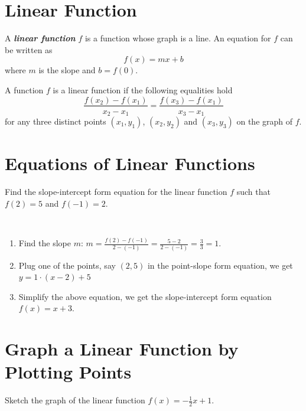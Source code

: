 \documentclass[en,11pt]{elegantbook}
\let\BeginKnitrBlock\begin \let\EndKnitrBlock\end
\begin{document}
\hypertarget{linear-function}{%
\section{Linear Function}\label{linear-function}}

A \textbf{\emph{linear function}} \(f\) is a function whose graph is a line. An equation for \(f\) can be written as
\[f(x) = mx + b\]
where \(m\) is the slope and \(b=f(0)\).

A function \(f\) is a linear function if the following equalities hold
\[
\dfrac{f(x_2)-f(x_1)}{x_2-x_1}
=\dfrac{f(x_3)-f(x_1)}{x_3-x_1}
\]
for any three distinct points \((x_1, y_1)\), \((x_2, y_2)\) and \((x_3, y_3)\) on the graph of \(f\).

\hypertarget{equations-of-linear-functions}{%
\section{Equations of Linear Functions}\label{equations-of-linear-functions}}

\BeginKnitrBlock{example}
\protect\hypertarget{exm:unnamed-chunk-233}{}{\label{exm:unnamed-chunk-233} }
Find the slope-intercept form equation for the linear function \(f\) such that \(f(2)=5\) and \(f(-1) = 2\).
\EndKnitrBlock{example}

\BeginKnitrBlock{solution}
{}\\

\begin{enumerate}
\def\labelenumi{\arabic{enumi}.}

\item
  Find the slope \(m\): \(m=\frac{f(2)-f(-1)}{2-(-1)}=\frac{5-2}{2-(-1)}=\frac{3}{3}=1\).
\item
  Plug one of the points, say \((2, 5)\) in the point-slope form equation, we get \(y=1\cdot(x-2)+5\)
\item
  Simplify the above equation, we get the slope-intercept form equation \(f(x)=x+3\).
\end{enumerate}
\EndKnitrBlock{solution}

\hypertarget{graph-a-linear-function-by-plotting-points}{%
\section{Graph a Linear Function by Plotting Points}\label{graph-a-linear-function-by-plotting-points}}

\BeginKnitrBlock{example}
\protect\hypertarget{exm:unnamed-chunk-235}{}{\label{exm:unnamed-chunk-235} }
Sketch the graph of the linear function \(f(x)=-\frac12 x + 1\).
\EndKnitrBlock{example}
\end{document}
